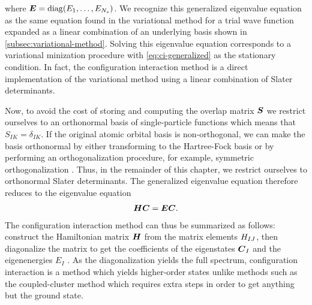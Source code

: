         where $\boldsymbol{E} = \operatorname{diag}(E_1, \dots, E_{N_s})$.
        We recognize this generalized eigenvalue equation as the same equation
        found in the variational method for a trial wave function expanded as a
        linear combination of an underlying basis shown in
        \autoref{subsec:variational-method}.
        Solving this eigenvalue equation corresponds to a variational minization
        procedure with \autoref{eq:ci-generalized} as the stationary condition.
        In fact, the configuration interaction method is a direct implementation
        of the variational method using a linear combination of Slater
        determinants.

        Now, to avoid the cost of storing and computing the overlap matrix
        $\boldsymbol{S}$ we restrict ourselves to an orthonormal basis of
        single-particle functions which means that $S_{IK} = \delta_{IK}$.
        If the original atomic orbital basis is non-orthogonal, we can make the
        basis orthonormal by either transforming to the Hartree-Fock basis or by
        performing an orthogonalization procedure, for example, symmetric
        orthogonalization \cite{mayer2002lowdin, szabo1996modern}.
        Thus, in the remainder of this chapter, we restrict ourselves to
        orthonormal Slater determinants.
        The generalized eigenvalue equation therefore reduces to the eigenvalue
        equation
        \begin{align}
            \boldsymbol{H}\boldsymbol{C} = \boldsymbol{E}\boldsymbol{C}.
        \end{align}
        The configuration interaction method can thus be summarized as follows:
        construct the Hamiltonian matrix $\boldsymbol{H}$ from the matrix elements
        $H_{IJ}$, then diagonalize the matrix to get the coefficients of
        the eigenstates $\boldsymbol{C}_I$ and the eigenenergies $E_I$
        \cite{karwowski}.
        As the diagonalization yields the full spectrum, configuration
        interaction is a method which yields higher-order states unlike methods
        such as the coupled-cluster method which requires extra steps in order
        to get anything but the ground state.

